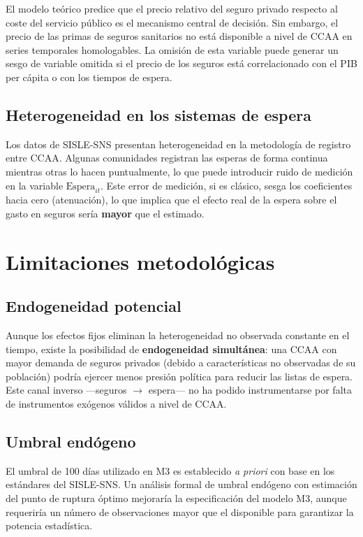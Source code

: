 El modelo teórico predice que el precio relativo del seguro privado respecto al
coste del servicio público es el mecanismo central de decisión. Sin embargo, el
precio de las primas de seguros sanitarios no está disponible a nivel de CCAA en
series temporales homologables. La omisión de esta variable puede generar un sesgo
de variable omitida si el precio de los seguros está correlacionado con el PIB
per cápita o con los tiempos de espera.

\subsection{Heterogeneidad en los sistemas de espera}

Los datos de SISLE-SNS presentan heterogeneidad en la metodología de registro
entre CCAA. Algunas comunidades registran las esperas de forma continua mientras
otras lo hacen puntualmente, lo que puede introducir ruido de medición en la
variable $\text{Espera}_{it}$. Este error de medición, si es clásico, sesga los
coeficientes hacia cero (atenuación), lo que implica que el efecto real de la
espera sobre el gasto en seguros sería \textbf{mayor} que el estimado.

\section{Limitaciones metodológicas}

\subsection{Endogeneidad potencial}

Aunque los efectos fijos eliminan la heterogeneidad no observada constante en el
tiempo, existe la posibilidad de \textbf{endogeneidad simultánea}: una CCAA con
mayor demanda de seguros privados (debido a características no observadas de su
población) podría ejercer menos presión política para reducir las listas de espera.
Este canal inverso ---seguros $\rightarrow$ espera--- no ha podido instrumentarse
por falta de instrumentos exógenos válidos a nivel de CCAA.

\subsection{Umbral endógeno}

El umbral de 100 días utilizado en M3 es establecido \textit{a priori} con base en
los estándares del SISLE-SNS. Un análisis formal de umbral endógeno
\parencite{Maddala1999} con estimación del punto de ruptura óptimo mejoraría la
especificación del modelo M3, aunque requeriría un número de observaciones mayor
que el disponible para garantizar la potencia estadística.

